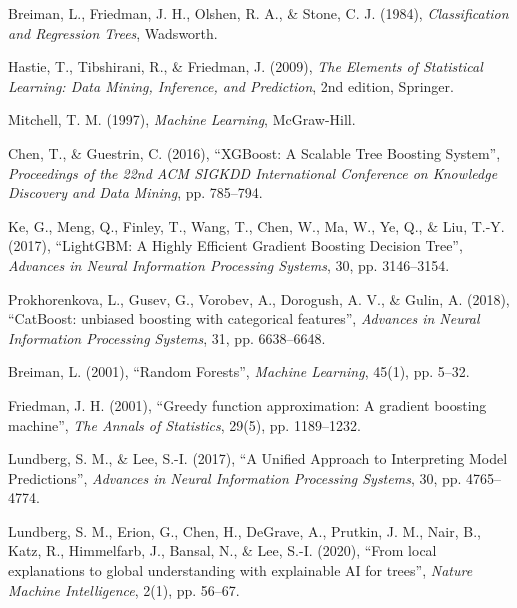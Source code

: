 \begin{enumerate}[label={[\arabic*]}, ref=\arabic*, leftmargin=*, labelsep=0.6em,
                  itemsep=5pt, start=8]
\item\label{ref:breiman1984} Breiman, L., Friedman, J. H., Olshen, R. A., \&
Stone, C. J. (1984), \textit{Classification and Regression Trees}, Wadsworth.

\item\label{ref:hastie2009} Hastie, T., Tibshirani, R., \& Friedman, J. (2009),
\textit{The Elements of Statistical Learning: Data Mining, Inference, and
Prediction}, 2nd edition, Springer.

\item\label{ref:mitchell1997} Mitchell, T. M. (1997), \textit{Machine Learning},
McGraw-Hill.

\item\label{ref:chen2016} Chen, T., \& Guestrin, C. (2016), ``XGBoost: A Scalable
Tree Boosting System'', \textit{Proceedings of the 22nd ACM SIGKDD International
Conference on Knowledge Discovery and Data Mining}, pp. 785--794.

\item\label{ref:ke2017} Ke, G., Meng, Q., Finley, T., Wang, T., Chen, W., Ma, W.,
Ye, Q., \& Liu, T.-Y. (2017), ``LightGBM: A Highly Efficient Gradient Boosting
Decision Tree'', \textit{Advances in Neural Information Processing Systems}, 30,
pp. 3146--3154.

\item\label{ref:prokhorenkova2018} Prokhorenkova, L., Gusev, G., Vorobev, A.,
Dorogush, A. V., \& Gulin, A. (2018), ``CatBoost: unbiased boosting with
categorical features'', \textit{Advances in Neural Information Processing
Systems}, 31, pp. 6638--6648.

\item\label{ref:breiman2001} Breiman, L. (2001), ``Random Forests'',
\textit{Machine Learning}, 45(1), pp. 5--32.

\item\label{ref:friedman2001} Friedman, J. H. (2001), ``Greedy function
approximation: A gradient boosting machine'', \textit{The Annals of Statistics},
29(5), pp. 1189--1232.

\item\label{ref:lundberg2017} Lundberg, S. M., \& Lee, S.-I. (2017), ``A Unified
Approach to Interpreting Model Predictions'', \textit{Advances in Neural
Information Processing Systems}, 30, pp. 4765--4774.

\item\label{ref:lundberg2020} Lundberg, S. M., Erion, G., Chen, H., DeGrave, A.,
Prutkin, J. M., Nair, B., Katz, R., Himmelfarb, J., Bansal, N., \& Lee, S.-I.
(2020), ``From local explanations to global understanding with explainable AI for
trees'', \textit{Nature Machine Intelligence}, 2(1), pp. 56--67.


\end{enumerate}
